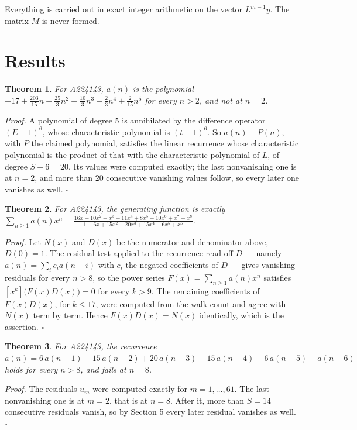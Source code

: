 \documentclass[11pt]{article}
\newtheorem{theorem}{Theorem}
\theoremstyle{definition}
\begin{document}
Everything is carried out in exact integer arithmetic on the vector $L^{m-1}y$. The matrix $M$ is never formed.

\section{Results}

\begin{theorem} For A224143, $a(n)$ is the polynomial $-17 + \frac{203}{15}n + \frac{25}{3}n^{2} + \frac{10}{3}n^{3} + \frac{2}{3}n^{4} + \frac{2}{15}n^{5}$ for every $n > 2$, and not at $n = 2$.\end{theorem}

{\itshape Proof.} A polynomial of degree $5$ is annihilated by the difference operator $(E-1)^{6}$, whose characteristic polynomial is $(t-1)^{6}$. So $a(n) - P(n)$, with $P$ the claimed polynomial, satisfies the linear recurrence whose characteristic polynomial is the product of that with the characteristic polynomial of $L$, of degree $S + 6 = 20$. Its values were computed exactly; the last nonvanishing one is at $n = 2$, and more than $20$ consecutive vanishing values follow, so every later one vanishes as well. $\square$

\begin{theorem} For A224143, the generating function is exactly $\sum_{n\ge 1} a(n)x^n = \frac{16x - 10x^{2} - x^{3} + 11x^{4} + 8x^{5} - 10x^{6} + x^{7} + x^{8}}{1 - 6x + 15x^{2} - 20x^{3} + 15x^{4} - 6x^{5} + x^{6}}$.\end{theorem}

{\itshape Proof.} Let $N(x)$ and $D(x)$ be the numerator and denominator above, $D(0)=1$. The residual test applied to the recurrence read off $D$ --- namely $a(n) = \sum_i c_i a(n-i)$ with $c_i$ the negated coefficients of $D$ --- gives vanishing residuals for every $n > 8$, so the power series $F(x)=\sum_{n\ge 1}a(n)x^n$ satisfies $[x^k]\bigl(F(x)D(x)\bigr) = 0$ for every $k > 9$. The remaining coefficients of $F(x)D(x)$, for $k \le 17$, were computed from the walk count and agree with $N(x)$ term by term. Hence $F(x)D(x) = N(x)$ identically, which is the assertion. $\square$

\begin{theorem} For A224143, the recurrence $a(n) = 6\,a(n-1) - 15\,a(n-2) + 20\,a(n-3) - 15\,a(n-4) + 6\,a(n-5) - a(n-6)$ holds for every $n > 8$, and fails at $n = 8$.\end{theorem}

{\itshape Proof.} The residuals $u_m$ were computed exactly for $m = 1,\dots,61$. The last nonvanishing one is at $m = 2$, that is at $n = 8$. After it, more than $S = 14$ consecutive residuals vanish, so by Section 5 every later residual vanishes as well. $\square$
\end{document}
